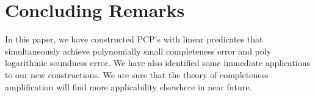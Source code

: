 \section{Concluding Remarks}
In this paper,  we have constructed PCP's with linear predicates that simultaneously 
achieve polynomially small completeness error and poly logarithmic soundness error. We have 
also identified some immediate applications to our new constructions. We are sure that the theory of completeness amplification will find more applicability elsewhere in near future.

